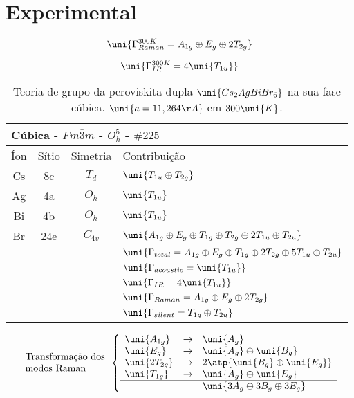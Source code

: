 \chapter{Experimental}

\begin{equation}
	\uni{\Gamma_{Raman}^{300 K} = A_{1g} \oplus E_{g} \oplus 2T_{2g}}
	\label{gamma_raman_300}
\end{equation}

\begin{equation}
	\uni{\Gamma_{IR}^{300 K} = 4\uni{T_{1u}}}
	\label{gamma_ir_300}
\end{equation}

\begin{table}[ht] \centering
	\begin{tabular}{cccl} \hline \hline
	    \multicolumn{4}{l}{Cúbica - $Fm\bar{3}m$ - $O^5_h$ - $\#225$}
 	    \\ \hline
		Íon & Sítio & Simetria & Contribuição \\ \hline
		Cs & 8c & $T_d$ & $\uni{T_{1u} \oplus T_{2g}}$\\
		Ag & 4a & $O_h$ & $\uni{T_{1u}}$ \\
		Bi & 4b & $O_h$ & $\uni{T_{1u}}$ \\
		Br & 24e & $C_{4v}$ & $\uni{A_{1g} \oplus E_{g} \oplus T_{1g} \oplus T_{2g} \oplus 2T_{1u} \oplus T_{2u}}$ \\ \hline
		&  &  & $
		\uni{\Gamma_{total} = A_{1g} \oplus E_{g} \oplus T_{1g} \oplus 2T_{2g} \oplus 5T_{1u} \oplus T_{2u}} $ \\
		&  &  & $\uni{\Gamma_{acoustic} =\uni{T_{1u}}}$ \\
		&  &  & $\uni{\Gamma_{IR} = 4\uni{T_{1u}}}$ \\
 		&  &  & $\uni{\Gamma_{Raman} = A_{1g} \oplus E_{g} \oplus 2T_{2g}}$ \\
 		&  &  & $\uni{\Gamma_{silent} = T_{1g} \oplus T_{2u}}$ \\ 
 		\hline \hline
	\end{tabular}
	\caption{Teoria de grupo da peroviskita dupla $\uni{Cs_2 Ag Bi Br_6}$ na sua fase cúbica. $\uni{a = 11,264\AA}$ em $300 \uni{K}$.}
	\label{tab_cubic}
\end{table}

$$
	\begin{array}{l}
		\mbox{Transformação dos} \\
		\mbox{modos Raman}
	\end{array}
	\left\{
		\begin{array}{lll}
			\uni{A_{1g}} & \rightarrow & \uni{A_{g}} \\
			\uni{E_{g}} & \rightarrow & \uni{A_{g}} \oplus \uni{B_{g}} \\
			\uni{2T_{2g}} & \rightarrow & 2\atp{\uni{B_{g}} \oplus \uni{E_{g}}} \\
			\uni{T_{1g}} & \rightarrow & \uni{A_{g}} \oplus \uni{E_{g}} \\ \hline 
			& & \uni{3A_{g} \oplus 3B_{g} \oplus 3E_{g}}
		\end{array}
	\right.
	\label{raman_modes_transform}
$$

